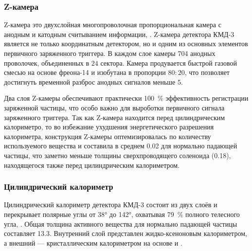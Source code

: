 \subsubsection{Z-камера}

Z-камера это двухслойная многопроволочная пропорциональная камера с анодным и катодным считыванием информации, \cite{Anashkin1992}.
Z-камера детектора КМД-3 является не только координатным детектором,
но и одним из основных элементов первичного заряженного триггера.
В каждом слое камеры \num{704} анодных проволочек, объединенных в $24$ сектора.
Камера продувается быстрой газовой смесью на основе фреона-14  и изобутана  в пропорции $80:20$,
что позволяет достигнуть временной разброс анодных сигналов меньше \SI{5}{\nsr}.

Два слоя Z-камеры обеспечивают практически \SI{100}{\percent} эффективность регистрации заряженной частицы,
что особо важно для выроботки первичного сигнала заряженного триггера.
Так как Z-камера находится перед цилиндрическим калориметро,
то во избежание ухудшения энергетического разрешения калориметра,
конструкция Z-камеры оптемизировалась по количеству используемого вещества и составила в среднем \SI{0.02}{\Xrad} для нормально падающей частицы,
что заметно меньше толщины сверхпроводящего соленоида (\SI{0.18}{\Xrad}),
находящегося также перед цилиндрическим калориметром.


\subsubsection{Цилиндрический калориметр}
\label{sel:barrel_calorimeter}

Цилиндрический калориметр детектора КМД-3 состоит из двух слоёв и перекрывает полярные углы от \ang{38} до \ang{142},
охватывая \SI{79}{\percent} полного телесного угла,
\cite{BarrelCalCMD3Anisenkov:2013yva}.
Общая толщина активного вещества для нормально падающей частицы составляет \SI{13.3}{\Xrad}.
Внутренний слой представлен жидко-ксеноновым калориметром,
а внешний
---
кристаллическим калориметром на основе  и .

